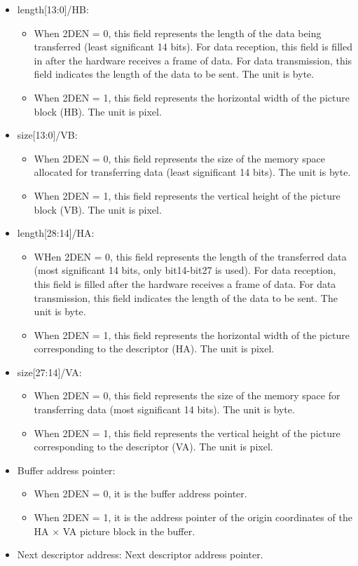 \documentclass[main\_\_EN.tex]{subfiles}
\begin{document}
\begin{itemize}
\item length[13:0]/HB:
    \begin{itemize}
    \item When 2DEN = 0, this field represents the length of the data being transferred (least significant 14 bits). For data reception, this field is filled in after the hardware receives a frame of data. For data transmission, this field indicates the length of the data to be sent. The unit is byte.
    \item When 2DEN = 1, this field represents the horizontal width of the picture block (HB). The unit is pixel.
    \end{itemize}

\item size[13:0]/VB:
    \begin{itemize}
    \item When 2DEN = 0, this field represents the size of the memory space allocated for transferring data (least significant 14 bits). The unit is byte.
    \item When 2DEN = 1, this field represents the vertical height of the picture block (VB). The unit is pixel.
    \end{itemize}
\item length[28:14]/HA:
    \begin{itemize}
    \item WHen 2DEN = 0, this field represents the length of the transferred data (most significant 14 bits, only bit14-bit27 is used). For data reception, this field is filled after the hardware receives a frame of data. For data transmission, this field indicates the length of the data to be sent. The unit is byte.
    \item When 2DEN = 1, this field represents the horizontal width of the picture corresponding to the descriptor (HA). The unit is pixel.
    \end{itemize}
\item size[27:14]/VA:
    \begin{itemize}
    \item When 2DEN = 0, this field represents the size of the memory space for transferring data (most significant 14 bits). The unit is byte.
    \item When 2DEN = 1, this field represents the vertical height of the picture corresponding to the descriptor (VA). The unit is pixel.
    \end{itemize}
\item Buffer address pointer:
    \begin{itemize}
    \item When 2DEN = 0, it is the buffer address pointer.
    \item When 2DEN = 1, it is the address pointer of the origin coordinates of the HA × VA picture block in the buffer.
    \end{itemize}
\item Next descriptor address: Next descriptor address pointer.
\end{itemize}
\end{document}
